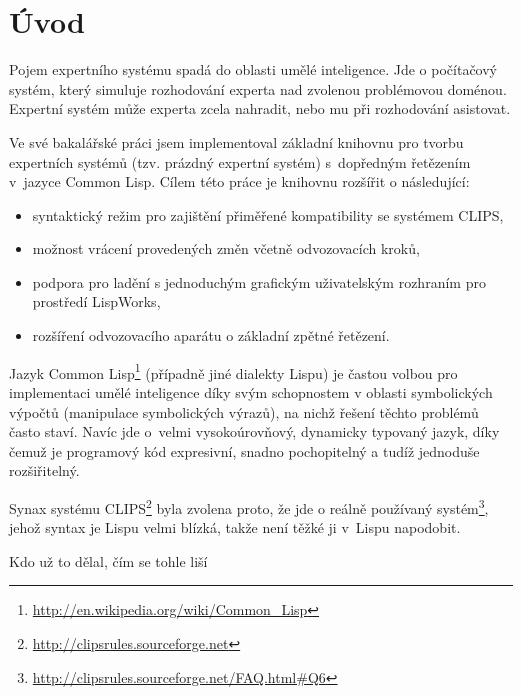 \section{Úvod}

Pojem expertního systému spadá do oblasti umělé inteligence. Jde o počítačový
systém, který simuluje rozhodování experta nad zvolenou problémovou doménou.
Expertní systém může experta zcela nahradit, nebo mu při rozhodování asistovat.

Ve své bakalářské práci \cite{bakalarka} jsem implementoval základní knihovnu pro tvorbu
expertních systémů (tzv. prázdný expertní systém) s~dopředným řetězením v~jazyce
Common Lisp. Cílem této práce je knihovnu rozšířit o následující:
\begin{itemize}
  \item syntaktický režim pro zajištění přiměřené kompatibility se systémem
    CLIPS,
  \item možnost vrácení provedených změn včetně odvozovacích kroků,
  \item podpora pro ladění s jednoduchým grafickým uživatelským rozhraním pro
    prostředí LispWorks\texttrademark,
  \item rozšíření odvozovacího aparátu o základní zpětné řetězení.
\end{itemize}

Jazyk Common Lisp\footnote{\url{http://en.wikipedia.org/wiki/Common\_Lisp}}
(případně jiné dialekty Lispu) je častou volbou pro implementaci umělé
inteligence díky svým schopnostem v oblasti symbolických výpočtů (manipulace
symbolických výrazů), na nichž řešení těchto problémů často staví. Navíc jde
o~velmi vysokoúrovňový, dynamicky typovaný jazyk, díky čemuž je programový kód
expresivní, snadno pochopitelný a tudíž jednoduše rozšiřitelný.

Synax systému CLIPS\footnote{\url{http://clipsrules.sourceforge.net}} byla
zvolena proto, že jde o reálně používaný
systém\footnote{\url{http://clipsrules.sourceforge.net/FAQ.html\#Q6}}, jehož
syntax je Lispu velmi blízká, takže není těžké ji v~Lispu napodobit.



\begin{framed}
  Kdo už to dělal, čím se tohle liší
\end{framed}
